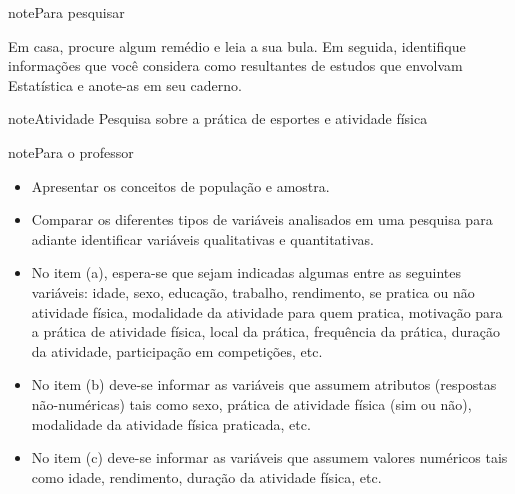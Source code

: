\begin{sphinxadmonition}{note}{Para pesquisar}

Em casa, procure algum remédio e leia a sua bula. Em seguida, identifique informações que você considera como resultantes de estudos que envolvam Estatística e anote-as em seu caderno.
\end{sphinxadmonition}


\label{\detokenize{PE103-0:ativ-3-pesquisa-ibge-pnad}}
\begin{sphinxadmonition}{note}{Atividade}{ Pesquisa sobre a prática de esportes e atividade física}


\begin{sphinxadmonition}{note}{Para o professor}

\begin{itemize}
\item {} 
Apresentar os conceitos de população e amostra.

\item {} 
Comparar os diferentes tipos de variáveis analisados em uma  pesquisa para adiante identificar variáveis qualitativas e quantitativas.

\end{itemize}

\begin{itemize}
\item {} 
No item (a), espera-se que sejam indicadas algumas entre as seguintes variáveis: idade, sexo,  educação, trabalho, rendimento, se pratica ou não atividade física, modalidade da atividade para quem pratica, motivação para a prática de atividade física, local da prática, frequência da prática, duração da atividade, participação em competições, etc.

\item {} 
No item (b) deve-se informar as variáveis que assumem atributos (respostas não-numéricas) tais como sexo, prática de atividade física (sim ou não), modalidade da atividade física praticada, etc.

\item {} 
No item (c) deve-se informar as variáveis que assumem valores numéricos tais como idade, rendimento, duração da atividade física, etc.

\end{itemize}
\end{sphinxadmonition}


\end{sphinxadmonition}
